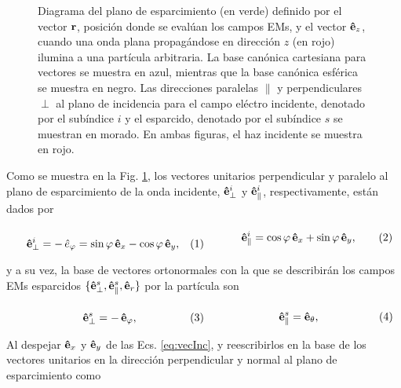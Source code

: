 \begin{figure}[h!]
%
\caption{Diagrama del plano de esparcimiento (en verde) definido por el vector $\vb{r}$, posición donde se evalúan los campos EMs, y el vector $\vu{e}_z$, cuando una onda plana propagándose en dirección $z$ (en rojo) ilumina a una partícula arbitraria.  La base canónica cartesiana para vectores se muestra en azul, mientras que la base canónica esférica se muestra en negro.  Las direcciones paralelas $\parallel$ y perpendiculares $\perp$ al plano de incidencia  para el campo eléctro incidente, denotado por el subíndice $i$ y el esparcido, denotado por el subíndice $s$ se muestran en morado.  En ambas figuras, el haz incidente se muestra en rojo.}\label{fig:PlanoEsparcimiento}
	\end{figure}	

Como se muestra en la Fig. \ref{fig:PlanoEsparcimiento}, los vectores unitarios perpendicular y paralelo al plano de esparcimiento de la onda incidente, $\vu{e}_{\perp}^i$  y $\vu{e}_{\parallel}^i$, respectivamente, están dados por \begin{subequations}

	\eqhalf{\vu{e}_{\perp}^i =-\, \hat{e}_\varphi  = \sin\varphi\,\vu{e}_x - \cos\varphi\,\vu{e}_y,}	
	\eqhalf{\vu{e}_{\parallel}^i = \cos\varphi\,\vu{e}_x + \sin\varphi\,\vu{e}_y,}	
	\label{eq:vecInc}\end{subequations}
	
\noindent y a su vez, la base de vectores ortonormales con la que se describirán los campos EMs esparcidos $\{\vu{e}_{\perp}^s,\vu{e}_{\parallel}^s,\vu{e}_r \}$ por la partícula son 

	\begin{subequations}	\eqhalf{\vu{e}_{\perp}^s= - \, \vu{e}_\varphi,}	
	\eqhalf{\vu{e}_{\parallel}^s = \vu{e}_\theta,}	
	\label{eq:vecScat}\end{subequations}
	
Al despejar $\vu{e}_x$ y $\vu{e}_y$  de las Ecs. \eqref{eq:vecInc}, y reescribirlos en la base de los vectores unitarios en la dirección perpendicular y normal al plano de esparcimiento como

